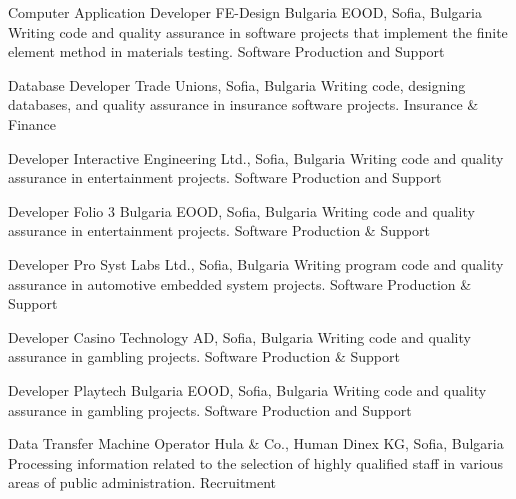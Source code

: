 \documentclass[english,a4paper]{europasscv}
\begin{document}
\begin{europasscv}
   {Computer Application Developer}
  \ecvitem {} {FE-Design Bulgaria EOOD, Sofia, Bulgaria}
  \ecvitem {} {Writing code and quality assurance in software projects that implement the finite element method in materials testing.}
  \ecvitem {} { \quad Software Production and Support}
  
   {Database Developer}
  \ecvitem {} {Trade Unions, Sofia, Bulgaria}
  \ecvitem {} {Writing code, designing databases, and quality assurance in insurance software projects.}
  \ecvitem {} { \quad Insurance \& Finance}
  
   {Developer}
  \ecvitem {} {Interactive Engineering Ltd., Sofia, Bulgaria}
  \ecvitem {} {Writing code and quality assurance in entertainment projects.}
  \ecvitem {} { \quad Software Production and Support}
  
   {Developer}
  \ecvitem {} {Folio 3 Bulgaria EOOD, Sofia, Bulgaria}
  \ecvitem {} {Writing code and quality assurance in entertainment projects.}
  \ecvitem {} { \quad Software Production \& Support}
  
   {Developer}
  \ecvitem {} {Pro Syst Labs Ltd., Sofia, Bulgaria}
  \ecvitem {} {Writing program code and quality assurance in automotive embedded system projects.}
  \ecvitem {} { \quad Software Production \& Support}
  
   {Developer}
  \ecvitem {} {Casino Technology AD, Sofia, Bulgaria}
  \ecvitem {} {Writing code and quality assurance in gambling projects.}
  \ecvitem {} { \quad Software Production \& Support}

   {Developer}
  \ecvitem {} {Playtech Bulgaria EOOD, Sofia, Bulgaria}
  \ecvitem {} {Writing code and quality assurance in gambling projects.}
  \ecvitem {} { \quad Software Production and Support}
  
   {Data Transfer Machine Operator}
  \ecvitem {} {Hula \& Co., Human Dinex KG, Sofia, Bulgaria}
  \ecvitem {} {Processing information related to the selection of highly qualified staff in various areas of public administration.}
  \ecvitem {} { \quad Recruitment}
  

\end{europasscv}
\end{document}
